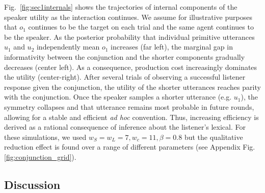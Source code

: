 Fig.~\ref{fig:sec1internals} shows the trajectories of internal components of the speaker utility as the interaction continues.
We assume for illustrative purposes that $o_1$ continues to be the target on each trial and the same agent continues to be the speaker.
As the posterior probability that individual primitive utterances $u_1$ and $u_2$ independently mean $o_1$ increases (far left), the marginal gap in informativity between the conjunction and the shorter components gradually decreases (center left).
As a consequence, production cost increasingly dominates the utility (center-right). 
After several trials of observing a successful listener response given the conjunction, the utility of the shorter utterances reaches parity with the conjunction.
Once the speaker samples a shorter utterance (e.g. $u_1$), the symmetry collapses and that utterance remains most probable in future rounds, allowing for a stable and efficient \emph{ad hoc} convention.
Thus, increasing efficiency is derived as a rational consequence of inference about the listener's lexical.
For these simulations, we used $w_S = w_L = 7, w_c = 11, \beta=0.8$ but the qualitative reduction effect is found over a range of different parameters (see Appendix Fig. \ref{fig:conjunction_grid}). 
%
%
%




\subsection{Discussion}

